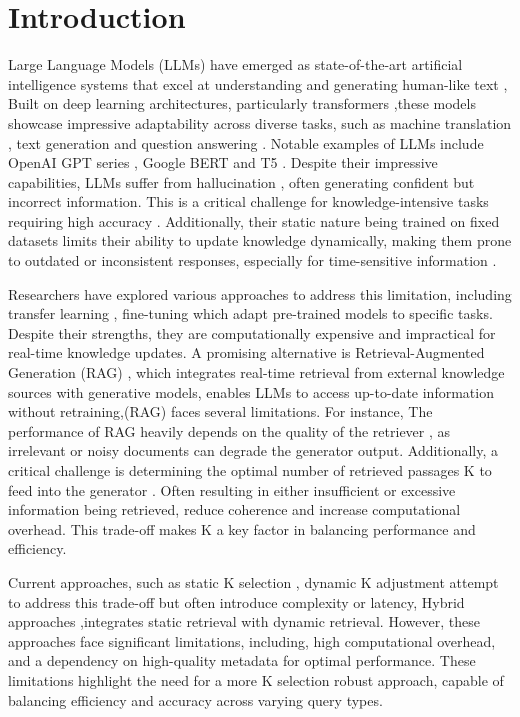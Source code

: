 \documentclass[Afour,sageh,times]{sagej}
\begin{document}
\section{Introduction}
Large Language Models (LLMs) have emerged as state-of-the-art artificial intelligence systems that excel at understanding and generating human-like text \cite{Radford2019}, Built on deep learning architectures, particularly transformers \cite{vaswani2017attention},these models showcase impressive adaptability across diverse tasks, such as machine translation \cite{Gu2018SearchEngine}, text generation \cite{liang2024controllabletextgenerationlarge} and question answering \cite{Zhang2023}. Notable examples of LLMs include OpenAI GPT series \cite{brown2020language}, Google BERT \cite{devlin2018bert} and T5 \cite{raffel2020exploring}. Despite their impressive capabilities, LLMs suffer from hallucination \cite{Radford2019}, often generating confident but incorrect information. This is a critical challenge for knowledge-intensive tasks requiring high accuracy \cite{Radford2019}. Additionally, their static nature being trained on fixed datasets \cite{Radford2019} limits their ability to update knowledge dynamically, making them prone to outdated or inconsistent responses, especially for time-sensitive information \cite{Mousavi2025}. 


Researchers have explored various approaches to address this limitation, including transfer learning \cite{zhuang2020comprehensive}, fine-tuning \cite{Howard2018} which adapt pre-trained models to specific tasks. Despite their strengths, they are computationally expensive and impractical for real-time knowledge updates. A promising alternative is Retrieval-Augmented Generation (RAG) \cite{Chuyuan2025}, which integrates real-time retrieval from external knowledge sources with generative models, enables LLMs to access up-to-date information without retraining,(RAG) faces several limitations. For instance, The performance of RAG heavily depends on the quality of the retriever \cite{karpukhin2020dpr}, as irrelevant or noisy documents can degrade the generator output. Additionally, a critical challenge is determining the optimal number of retrieved passages K to feed into the generator \cite{lewis2020retrieval}. Often resulting in either insufficient or excessive information being retrieved, reduce coherence and increase computational overhead. This trade-off makes K a key factor in balancing performance and efficiency. 

Current approaches, such as static K selection \cite{lewis2020retrieval}, dynamic K adjustment attempt to address this trade-off but often introduce complexity or latency, Hybrid approaches \cite{yuan2024hybrid},integrates static retrieval with dynamic retrieval. However, these approaches face significant limitations, including, high computational overhead, and a dependency on high-quality metadata for optimal performance. These limitations highlight the need for a more K selection robust approach, capable of balancing efficiency and accuracy across varying query types.
\end{document}

